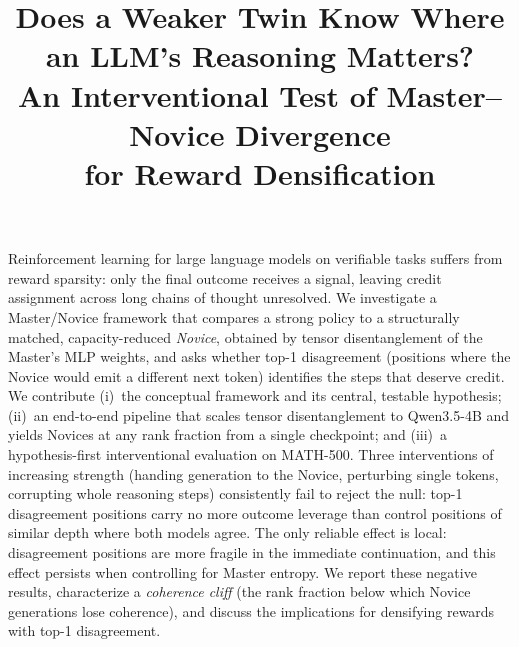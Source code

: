 \documentclass[9pt]{article}
\title{Does a Weaker Twin Know Where an LLM's Reasoning Matters?\\
An Interventional Test of Master--Novice Divergence\\for Reward Densification}
\date{}
\begin{document}
\makelogos
\thispagestyle{empty}

\makepapertitle

\begin{rgabstractbox}
Reinforcement learning for large language models on verifiable tasks suffers
from reward sparsity: only the final outcome receives a signal, leaving
credit assignment across long chains of thought unresolved. We investigate a
Master/Novice framework that compares a strong policy to a structurally
matched, capacity-reduced \emph{Novice}, obtained by tensor disentanglement
of the Master's MLP weights, and asks whether top-1 disagreement (positions
where the Novice would emit a different next token) identifies the steps
that deserve credit. We contribute (i)~the conceptual framework and its
central, testable hypothesis; (ii)~an end-to-end pipeline that scales tensor
disentanglement to Qwen3.5-4B and yields Novices at any rank fraction from a
single checkpoint; and (iii)~a hypothesis-first interventional evaluation on
MATH-500. Three interventions of increasing strength (handing generation to
the Novice, perturbing single tokens, corrupting whole reasoning steps)
consistently fail to reject the null: top-1 disagreement positions carry no
more outcome leverage than control positions of similar depth where both
models agree. The only reliable effect is local: disagreement positions are
more fragile in the immediate continuation, and this effect persists when
controlling for Master entropy. We report these negative results,
characterize a \emph{coherence cliff} (the rank fraction below which Novice
generations lose coherence), and discuss the implications for densifying
rewards with top-1 disagreement.

\end{rgabstractbox}

\vspace{1.2em}
\end{document}
